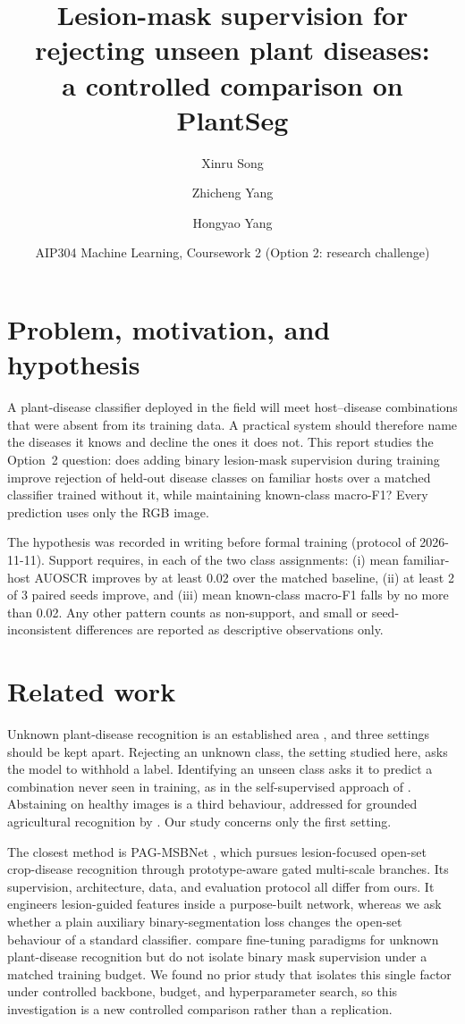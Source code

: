 \documentclass[10pt,a4paper]{article}
\title{\vspace{-8mm}Lesion-mask supervision for rejecting unseen plant diseases:\\a controlled comparison on PlantSeg}
\author{Xinru Song \and Zhicheng Yang \and Hongyao Yang}
\date{AIP304 Machine Learning, Coursework 2 (Option 2: research challenge)}
\begin{document}
\maketitle
\vspace{-6mm}

\section{Problem, motivation, and hypothesis}
A plant-disease classifier deployed in the field will meet host--disease combinations that were absent
from its training data. A practical system should therefore name the diseases it knows and decline the
ones it does not. This report studies the Option~2 question: does adding binary lesion-mask supervision
during training improve rejection of held-out disease classes on familiar hosts over a matched classifier
trained without it, while maintaining known-class macro-F1? Every prediction uses only the RGB image.

The hypothesis was recorded in writing before formal training (protocol of 2026-11-11). Support requires,
in each of the two class assignments: (i) mean familiar-host AUOSCR improves by at least 0.02 over the
matched baseline, (ii) at least 2 of 3 paired seeds improve, and (iii) mean known-class macro-F1 falls by
no more than 0.02. Any other pattern counts as non-support, and small or seed-inconsistent differences
are reported as descriptive observations only.

\section{Related work}
Unknown plant-disease recognition is an established area \citep{dong2024impact}, and three settings should
be kept apart. Rejecting an unknown class, the setting studied here, asks the model to withhold a label.
Identifying an unseen class asks it to predict a combination never seen in training, as in the
self-supervised approach of \citet{chai2024beyond}. Abstaining on healthy images is a third behaviour,
addressed for grounded agricultural recognition by \citet{alshehhi2026agroground}. Our study concerns only
the first setting.

The closest method is PAG-MSBNet \citep{yan2026pag}, which pursues lesion-focused open-set crop-disease
recognition through prototype-aware gated multi-scale branches. Its supervision, architecture, data, and
evaluation protocol all differ from ours. It engineers lesion-guided features inside a purpose-built
network, whereas we ask whether a plain auxiliary binary-segmentation loss changes the open-set behaviour
of a standard classifier. \citet{dong2024impact} compare fine-tuning paradigms for unknown plant-disease
recognition but do not isolate binary mask supervision under a matched training budget. We found no prior
study that isolates this single factor under controlled backbone, budget, and hyperparameter search, so
this investigation is a new controlled comparison rather than a replication.
\end{document}

